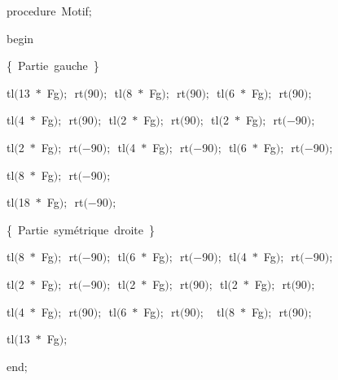 {\pagebreak[3] 
\vspace{\neglskip}\mbox{\blc  \blk\idt  \mcl procedure\idt \ Motif$;$}\par 
\vspace{\neglskip}\mbox{\blc  \blk\idt  \mcl begin\idt }\par 
\vspace{\neglskip}\mbox{\blc  \blk\blk\idt  \cmt  \{\ Partie\ gauche\ \}\idt }\par 
\vspace{\neglskip}\mbox{\blc  \blk\blk\idt  tl$($13\ $\ast$\ Fg$)$$;$\ rt$($90$)$$;$\ tl$($8\ $\ast$\ Fg$)$$;$\ rt$($90$)$$;$\ tl$($6\ $\ast$\ Fg$)$$;$\ rt$($90$)$$;$\ }\par 
\vspace{\neglskip}\mbox{\blc  \blk\blk\idt  tl$($4\ $\ast$\ Fg$)$$;$\ rt$($90$)$$;$\ tl$($2\ $\ast$\ Fg$)$$;$\ rt$($90$)$$;$\ tl$($2\ $\ast$\ Fg$)$$;$\ rt$($$-$90$)$$;$\ }\par 
\vspace{\neglskip}\mbox{\blc  \blk\blk\idt  tl$($2\ $\ast$\ Fg$)$$;$\ rt$($$-$90$)$$;$\ tl$($4\ $\ast$\ Fg$)$$;$\ rt$($$-$90$)$$;$\ tl$($6\ $\ast$\ Fg$)$$;$\ rt$($$-$90$)$$;$\ }\par 
\vspace{\neglskip}\mbox{\blc  \blk\blk\idt  tl$($8\ $\ast$\ Fg$)$$;$\ rt$($$-$90$)$$;$\ }\par 
\vspace{\neglskip}\mbox{\blc  \blk\blk\idt  tl$($18\ $\ast$\ Fg$)$$;$\ rt$($$-$90$)$$;$\ \ }\par 
\vspace{\neglskip}\mbox{\blc  \blk\blk\idt  \cmt  \{\ Partie\ symétrique\ droite\ \}\idt }\par 
\vspace{\neglskip}\mbox{\blc  \blk\blk\idt  tl$($8\ $\ast$\ Fg$)$$;$\ rt$($$-$90$)$$;$\ tl$($6\ $\ast$\ Fg$)$$;$\ rt$($$-$90$)$$;$\ tl$($4\ $\ast$\ Fg$)$$;$\ rt$($$-$90$)$$;$}\par 
\vspace{\neglskip}\mbox{\blc  \blk\blk\idt  tl$($2\ $\ast$\ Fg$)$$;$\ rt$($$-$90$)$$;$\ tl$($2\ $\ast$\ Fg$)$$;$\ rt$($90$)$$;$\ tl$($2\ $\ast$\ Fg$)$$;$\ rt$($90$)$$;$}\par 
\vspace{\neglskip}\mbox{\blc  \blk\blk\idt  tl$($4\ $\ast$\ Fg$)$$;$\ rt$($90$)$$;$\ tl$($6\ $\ast$\ Fg$)$$;$\ rt$($90$)$$;$\ \ tl$($8\ $\ast$\ Fg$)$$;$\ rt$($90$)$$;$}\par 
\vspace{\neglskip}\mbox{\blc  \blk\blk\idt  tl$($13\ $\ast$\ Fg$)$$;$\ }\par 
\vspace{\neglskip}\mbox{\blc  \blk\idt  \mcl end\idt $;$}\par 
\medskip

}
